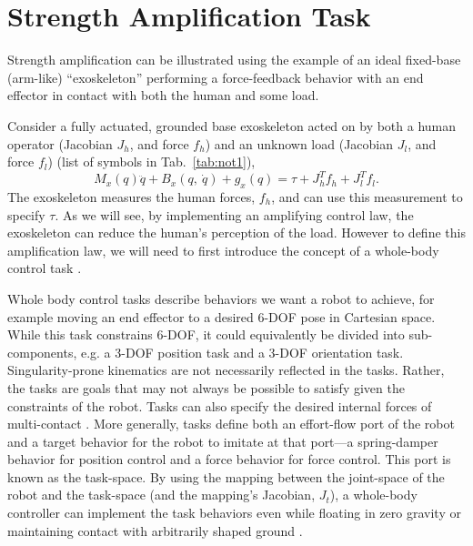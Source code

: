 \documentclass[utf8]{frontiersSCNS}
\renewcommand*{\cite}[1]{\citep{#1}}
\newcommand{\add}[1]{\textcolor[HTML]{8710b3}{#1}}
\begin{document}

\section{Strength Amplification Task}\label{sec:theory}
Strength amplification can be illustrated using the example of an ideal fixed-base (arm-like) ``exoskeleton'' performing a force-feedback behavior with an end effector in contact with both the human and some load.



Consider a fully actuated, grounded base exoskeleton acted on by both a human operator (Jacobian $J_h$, and force $f_h$) and an unknown load (Jacobian $J_l$, and force $f_l$) (list of symbols in Tab.~\ref{tab:not1}),
\begin{equation}
M_x(q) \ddot q + B_x(q,\ \dot q) + g_x(q) = \tau + J_h^T f_h + J_l^T f_l.\label{eq:exo_equation}
\end{equation}
The exoskeleton measures the human forces, $f_h$, and can use this measurement to specify $\tau$. 
As we will see, by implementing an amplifying control law, the exoskeleton can reduce the human's perception of the load. 
However to define this amplification law, we will need to first introduce the concept of a whole-body control task \cite{SentisParkKhatib2010TRO}.

Whole body control tasks describe behaviors we want a robot to achieve, for example moving an end effector to a desired 6-DOF pose in Cartesian space. While this task constrains 6-DOF, it could equivalently be divided into sub-components, e.g. a 3-DOF position task and a 3-DOF orientation task.
\add{Singularity-prone kinematics are not necessarily reflected in the tasks. Rather, the tasks are goals that may not always be possible to satisfy given the constraints of the robot.}
Tasks can also specify the desired internal forces of multi-contact \cite{KimEA2016TRO}.
More generally, tasks define both an effort-flow port of the robot and a target behavior for the robot to imitate at that port---a spring-damper behavior for position control and a force behavior for force control. This port is known as the task-space. By using the mapping between the joint-space of the robot and the task-space (and the mapping's Jacobian, $J_t$), a whole-body controller can implement the task behaviors even while floating in zero gravity or maintaining contact with arbitrarily shaped ground \cite{SentisParkKhatib2010TRO}. 
\end{document}
